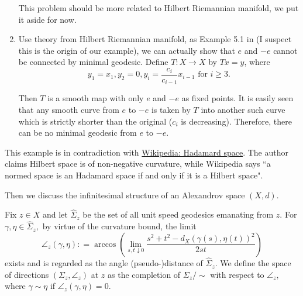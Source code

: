 \begin{rmk}
\begin{enumerate}
		      This problem should be more related to Hilbert Riemannian manifold, we put it aside for now.
		\item Use theory from Hilbert Riemannian manifold, as Example 5.1 in \cite{grossman1965hilbert} (I suspect this is the origin of our example), we can actually show that $e$ and $-e$ cannot be connected by minimal geodesic.
		      Define \( T: X \rightarrow X \) by \( T x = y \), where
		      \[
			      y _ { 1 } = x _ { 1 } , y _ { 2 } = 0 , y _ { i } = \frac{c_i}{c_{i-1}} x_{i-1} \text { for } i \geq 3 . \]

		      Then \( T \) is a smooth map with only \( e \) and \(- e \) as fixed points. It is easily seen that any smooth curve from \( e\) to \( -e \) is taken by \( T \) into another such curve which is strictly shorter than the original ($c_i$ is decreasing). Therefore, there can be no minimal geodesic from \( e \) to \( -e . \)


	\end{enumerate}
\end{rmk}

\begin{rmk}[Exmaple 2.1 c]
	This example is in contradiction with \href{https://en.wikipedia.org/wiki/Hadamard_space}{Wikipedia: Hadamard space}. The author claims Hilbert space is of non-negative curvature, while Wikipedia says ``a normed space is an Hadamard space if and only if it is a Hilbert space".
\end{rmk}

Then we discuss the infinitesimal structure of an Alexandrov space \( ( X , d ) . \)

\begin{defn}
	Fix \( z \in X \) and let \( \hat { \Sigma } _ { z } \) be the set of all unit speed geodesics emanating from \( z \). For \( \gamma , \eta \in \hat { \Sigma } _ { z } , \) by virtue of the curvature bound, the limit
	\begin{equation}
		\label{angle_def}
		\angle _ { z } ( \gamma , \eta ): = \arccos \left( \lim _ { s , t \downarrow 0 } \frac { s ^ { 2 } + t ^ { 2 } - d _ { X }\left( \gamma ( s ) , \eta ( t ) \right) ^ { 2 } } { 2 s t } \right)
	\end{equation}
	exists and is regarded as the angle (pseudo-)distance of \( \hat { \Sigma } _ { z } . \) We define the space of directions \( \left( \Sigma _ { z } , \angle _ { z } \right) \) at \( z \) as the completion of \( \Sigma _ { z } / \sim \) with respect to \( \angle _ { z } , \) where \( \gamma \sim \eta \) if \( \angle _ { z } ( \gamma , \eta ) = 0 . \)
\end{defn}

